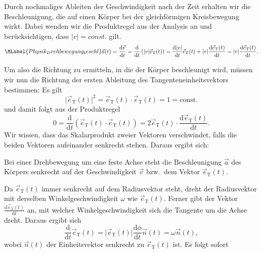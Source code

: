 \begin{MExtra}
  
  Durch nochmaliges Ableiten der Geschwindigkeit nach der Zeit erhalten wir die Beschleunigung, die auf einen K\"orper bei der gleichf\"ormigen Kreisbewegung wirkt. Dabei wenden wir die Produktregel aus der Analysis an und ber\"ucksichtigen, dass $\vert v\vert=const.$ gilt.
  \begin{equation}\MLabel{Physik_Drehbewegung_beschl}
  \vec{a}(t)=\frac{\textrm{d}\vec{v}}{\textrm{d}t}=\frac{\textrm{d}}{\textrm{d}t}\left(\vert v\vert\vec{e}_{\textrm{T}}(t)\right)=\frac{\textrm{d}\vert v\vert}{\textrm{d}t}\vec{e}_{\textrm{T}}(t)+\vert v\vert\frac{\textrm{d}\vec{e}_{\textrm{T}}(t)}{\textrm{d}t}=\vert v\vert\frac{\textrm{d}\vec{e}_{\textrm{T}}(t)}{\textrm{d}t}.
  \end{equation} 
  
  
  Um also die Richtung zu ermitteln, in die der K\"orper beschleunigt wird, m\"ussen wir nun die Richtung der ersten Ableitung des Tangenteneinheitsvektors bestimmen: Es gilt
  \begin{equation*}
  \vert \vec{e}_{\textrm{T}}(t)\vert^2=\vec{e}_{\textrm{T}}(t)\cdot \vec{e}_{\textrm{T}}(t)= 1=\textrm{const.}
  \end{equation*} und damit folgt aus der Produktregel
  \begin{equation}
  0=\frac{\textrm{d}}{\textrm{d}t}\left(\vec{e}_{\textrm{T}}(t)\cdot \vec{e}_{\textrm{T}}(t)\right)=2 \vec{e}_{\textrm{T}}(t)\cdot\frac{\textrm{d}\vec{e}_{\textrm{T}}(t)}{\textrm{d}t}.
  \end{equation} Wir wissen, dass das Skalarprodukt zweier Vektoren verschwindet, falls die beiden Vektoren aufeinander senkrecht stehen. Daraus ergibt sich:
  
  \begin{MInfo}
  Bei einer Drehbewegung um eine feste Achse steht die Beschleunigung $\vec{a}$ des K\"orpers senkrecht auf der Geschwindigkeit $\vec{v}$ bzw.~dem Vektor $\vec{e}_{\textrm{T}}(t)$. 
  \end{MInfo}
  
  Da $\vec{e}_{\textrm{T}}(t)$ immer senkrecht auf dem Radiusvektor steht, dreht der Radiusvektor mit derselben Winkelgeschwindigkeit $\omega$ wie  $\vec{e}_{\textrm{T}}(t)$. Ferner gibt der Vektor $\frac{\textrm{d}\vec{e}_{\textrm{T}}(t)}{\textrm{d}t}$ an, mit welcher Winkelgeschwindigkeit sich die Tangente um die Achse dreht. Daraus ergibt sich
  \begin{equation}
  \frac{\textrm{d}}{\textrm{d}t}\vec{e}_{\textrm{T}}(t)=\vert\vec{e}_{\textrm{T}}(t)\vert \frac{\textrm{d}\phi}{\textrm{d}t}\vec{n}(t)=\omega\vec{n}(t),
  \end{equation}wobei $\vec{n}(t)$ der Einheitsvektor senkrecht zu $\vec{e}_{\textrm{T}}(t)$ ist. Es folgt sofort
  

\end{MExtra}
